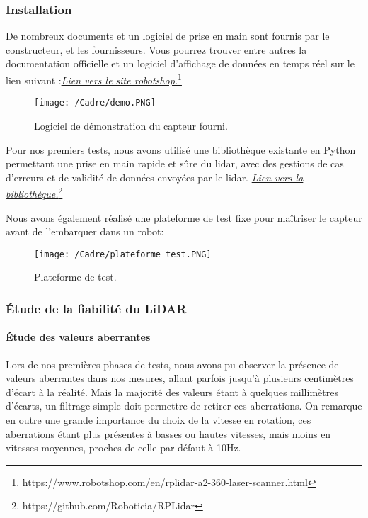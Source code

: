 \subsubsection{Installation}
\tab De nombreux documents et un logiciel de prise en main sont fournis par le constructeur, et les fournisseurs. Vous pourrez trouver entre autres la documentation officielle et un logiciel d’affichage de données en temps réel sur le lien suivant :\newline \href{https://www.robotshop.com/en/rplidar-a2-360-laser-scanner.html}{\textit{Lien vers le site robotshop.}}\footnote{https://www.robotshop.com/en/rplidar-a2-360-laser-scanner.html}

\begin{figure}[htp]
    \centering
    \texttt{[image: /Cadre/demo.PNG]}
    \caption{Logiciel de démonstration du capteur fourni.}
\end{figure}

Pour nos premiers tests, nous avons utilisé une bibliothèque existante en Python permettant une prise en main rapide et sûre du lidar, avec des gestions de cas d’erreurs et de validité de données envoyées par le lidar.
\href{https://github.com/Roboticia/RPLidar}{\textit{Lien vers la bibliothèque.}}\footnote{https://github.com/Roboticia/RPLidar}


Nous avons également réalisé une plateforme de test fixe pour maîtriser le capteur avant de l’embarquer dans un robot:

\begin{figure}[htp]
    \centering
    \texttt{[image: /Cadre/plateforme\_test.PNG]}
    \caption{Plateforme de test.}
\end{figure}

\subsubsection{Étude de la fiabilité du LiDAR}
\paragraph{Étude des valeurs aberrantes}
\tab Lors de nos premières phases de tests, nous avons pu observer la présence de valeurs aberrantes dans nos mesures, allant parfois jusqu'à plusieurs centimètres d'écart à la réalité. Mais la majorité des valeurs étant à quelques millimètres d'écarts, un filtrage simple doit permettre de retirer ces aberrations.
On remarque en outre une grande importance du choix de la vitesse en rotation, ces aberrations étant plus présentes à basses ou hautes vitesses, mais moins en vitesses moyennes, proches de celle par défaut à 10Hz.

